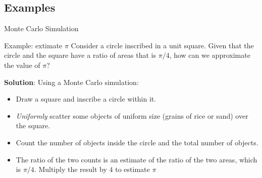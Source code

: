 \documentclass{beamer}
\begin{document}
\subsection{Examples}

\begin{frame}{Monte Carlo Simulation}
\begin{block}{Example: extimate $\pi$}
Consider a circle inscribed in a unit square. Given that the circle and the square have a ratio of areas that is $\pi/4$, how can we approximate the value of $\pi$?
\end{block}
\textbf{Solution}:  Using a Monte Carlo simulation:
\begin{itemize}
\item Draw a square and inscribe a circle within it.
\item \textit{Uniformly} scatter some objects of uniform size (grains of rice or sand) over the square.
\item Count the number of objects inside the circle and the total number of objects.
\item The ratio of the two counts is an estimate of the ratio of the two areas, which is $\pi/4$. Multiply the result by $4$ to estimate $\pi$
\end{itemize}
\end{frame}
\end{document}
